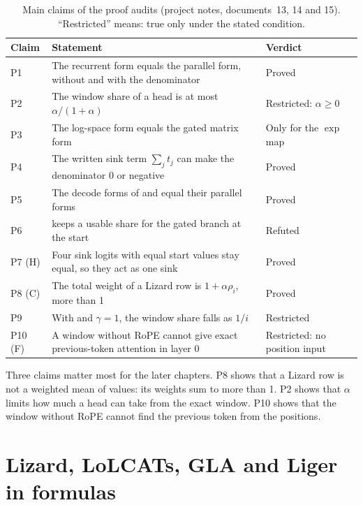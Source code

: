 \begin{table}[ht]
\centering
\small
\caption[Main claims of the proof audits]{Main claims of the proof audits (project notes, documents~13, 14 and 15). \enquote{Restricted} means: true only under the stated condition.}
\label{tab:proofs}
\begin{tabularx}{\linewidth}{@{}lLl@{}}
\toprule
Claim & Statement & Verdict \\
\midrule
P1 & The recurrent form equals the parallel form, without and with the denominator & Proved \\
P2 & The window share of a head is at most $\alpha / (1 + \alpha)$ & Restricted: $\alpha \ge 0$ \\
P3 & The log-space form equals the gated matrix form & Only for the $\exp$ map \\
P4 & The written sink term $\sum_j t_j$ can make the denominator 0 or negative & Proved \\
P5 & The decode forms of  and  equal their parallel forms & Proved \\
P6 &  keeps a usable share for the gated branch at the start & Refuted \\
P7 (H) & Four sink logits with equal start values stay equal, so they act as one sink & Proved \\
P8 (C) & The total weight of a Lizard row is $1 + \alpha\rho_i$, more than 1 & Proved \\
P9 & With  and $\gamma = 1$, the window share falls as $1/i$ & Restricted \\
P10 (F) & A window without RoPE cannot give exact previous-token attention in layer 0 & Restricted: no position input \\
\bottomrule
\end{tabularx}
\end{table}

Three claims matter most for the later chapters. P8 shows that a Lizard row is not a weighted mean of values: its weights sum to more than 1. P2 shows that $\alpha$ limits how much a head can take from the exact window. P10 shows that the window without RoPE cannot find the previous token from the positions.

\section{Lizard, LoLCATs, GLA and Liger in formulas}
\label{sec:fourmethods}


